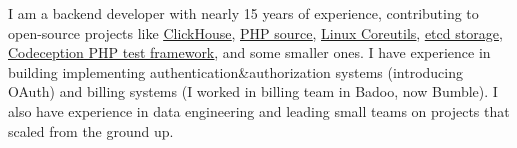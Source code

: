 I am a backend developer with nearly 15 years of experience, contributing to
open-source projects like
\href{https://github.com/ClickHouse/ClickHouse/pulls?q=is\%3Apr+is\%3Aclosed+author\%3AGSokol}{\underline{ClickHouse}},
\href{https://github.com/php/php-src/pulls?q=is\%3Apr+is\%3Aclosed+author\%3AGSokol}{\underline{PHP source}},
\href{https://github.com/coreutils/coreutils/commits?author=GSokol}{\underline{Linux Coreutils}},
\href{https://github.com/etcd-io/etcd/pulls?q=is\%3Apr+is\%3Aclosed+author\%3AGSokol}{\underline{etcd storage}},
\href{https://github.com/Codeception/Codeception/pulls?q=is\%3Apr+is\%3Aclosed+author\%3AGSokol}{\underline{Codeception PHP test framework}},
and some smaller ones. I have experience in building implementing
authentication\&authorization systems (introducing OAuth) and billing systems
(I worked in billing team in Badoo, now Bumble). I also have experience in
data engineering and leading small teams on projects that scaled from the
ground up.
